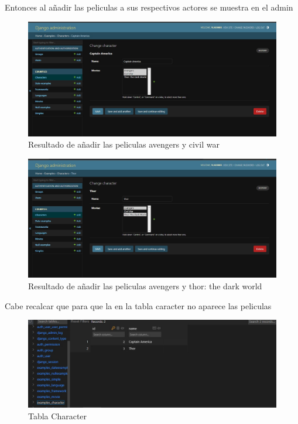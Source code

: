 \documentclass{article}
\begin{document}
Entonces al añadir las peliculas a sus respectivos actores se muestra en el admin

\begin{figure}[!h]
    \centering
    \includegraphics{img/3.jpg}
    \caption{Resultado de añadir las peliculas avengers y civil war}
    \label{fig:enter-label}
\end{figure}

\begin{figure}[!h]
    \centering
    \includegraphics{img/4.jpg}
    \caption{Resultado de añadir las peliculas avengers y thor: the dark world}
    \label{fig:enter-label}
\end{figure}

\newpage

Cabe recalcar que para que la en la tabla caracter no aparece las peliculas

\begin{figure}[!h]
    \centering
    \includegraphics[scale=1.5]{img/character.jpg}
    \caption{Tabla Character}
    \label{fig:enter-label}
\end{figure}
\end{document}
